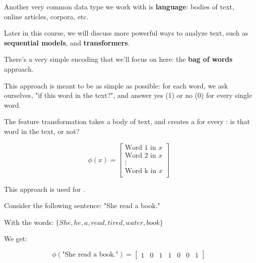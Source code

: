             Another very common data type we work with is \textbf{language}: bodies of text, online articles, corpora, etc.

            Later in this course, we will discuss more powerful ways to analyze text, such as \textbf{sequential models}, and \textbf{transformers}.

            There's a very simple encoding that we'll focus on here: the \textbf{bag of words} approach.

            This approach is meant to be as simple as possible: for each word, we ask ourselves, "if this word in the text?", and answer yes (1) or no (0) for every single word.\\

            \begin{definition}
                The  feature transformation takes a body of text, and creates a  for every : is that word in the text, or not?

                \begin{equation}
                    \phi(x) = 
                    \begin{bmatrix}
                        \text{Word 1 in } x \\
                        \text{Word 2 in } x \\
                        \vdots \\
                        \text{Word k in } x \\
                    \end{bmatrix}
                \end{equation}

                This approach is used for .
            \end{definition}

            \miniex Consider the following sentence: "She read a book."

            With the words: $\{She, he, a, read, tired, water, book\}$

            We get:

            \begin{equation}
                \phi(\text{"She read a book."}) =
                \begin{bmatrix}
                    1& 0& 1& 1& 0& 0& 1
                \end{bmatrix}
            \end{equation}

